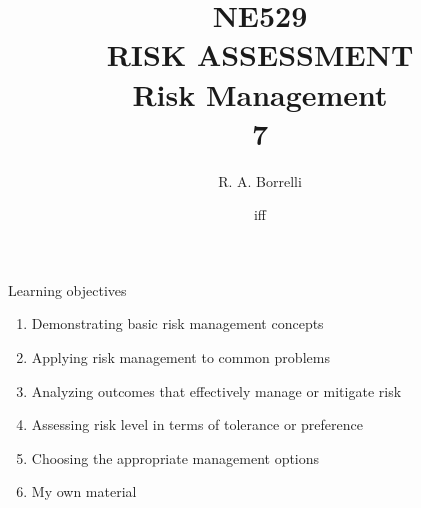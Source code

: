 \documentclass[aspectratio=1610,pdftex,dvipsnames,compress,xcolor={dvipsnames}]{beamer}
\title[NE529 -- Risk Assessment]{NE529\\RISK ASSESSMENT\\Risk Management\\7}
\author[@TheDoctorRAB]{R. A. Borrelli}
\institute[]{
    \acl{ui}\\
    \vspace{0.10in}
    }
\date{\acl{iff}}
\begin{document}
\nobibliography* %


{
    \begin{frame}[plain]{}
        \titlepage
    \end{frame}
}


\begin{frame}{Learning objectives}
    \begin{enumerate}[series=outerlist,topsep=0pt,itemsep=21pt,leftmargin=*,label=(\arabic*)]
        \item[]Demonstrating basic risk management concepts 
        \item[]Applying risk management to common problems 
        \item[]Analyzing outcomes that effectively manage or mitigate risk
        \item[]Assessing risk level in terms of tolerance or preference
        \item[]Choosing the appropriate management options
        \item[]My own material
    \end{enumerate}
\end{frame}
\end{document}
